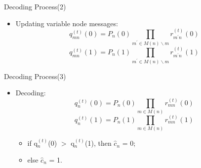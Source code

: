 \documentclass{beamer}
\begin{document}
\begin{frame}
    \begin{block}{Decoding Process(2)}
        \begin{itemize}
        \item Updating variable node messages:\begin{equation*}
                                              q_{mn}^{(t)}(0)=P_n(0)\prod_{m^\prime\in M(n)\backslash m}r_{m^\prime n}^{(t)}(0)
                                              \end{equation*}
                                              \begin{equation*}
                                              q_{mn}^{(t)}(1)=P_n(1)\prod_{m^\prime\in M(n)\backslash m}r_{m^\prime n}^{(t)}(1)
                                              \end{equation*}
        \end{itemize}
    \end{block}
\end{frame}
\begin{frame}
    \begin{block}{Decoding Process(3)}
        \begin{itemize}
        \item Decoding:\begin{equation*}
                                              q_{n}^{(t)}(0)=P_n(0)\prod_{m\in M(n)}r_{mn}^{(t)}(0)
                                              \end{equation*}
                                              \begin{equation*}
                                              q_{n}^{(t)}(1)=P_n(1)\prod_{m\in M(n)}r_{mn}^{(t)}(1)
                                              \end{equation*}
                                              \begin{itemize}
                                              \item if q$_{n}^{(t)}$(0) $>$ q$_{n}^{(t)}$(1), then $\hat{c}_n$ = 0;
                                              \item else $\hat{c}_n$ = 1.
                                              \end{itemize}
        \end{itemize}
    \end{block}
\end{frame}
\end{document}
